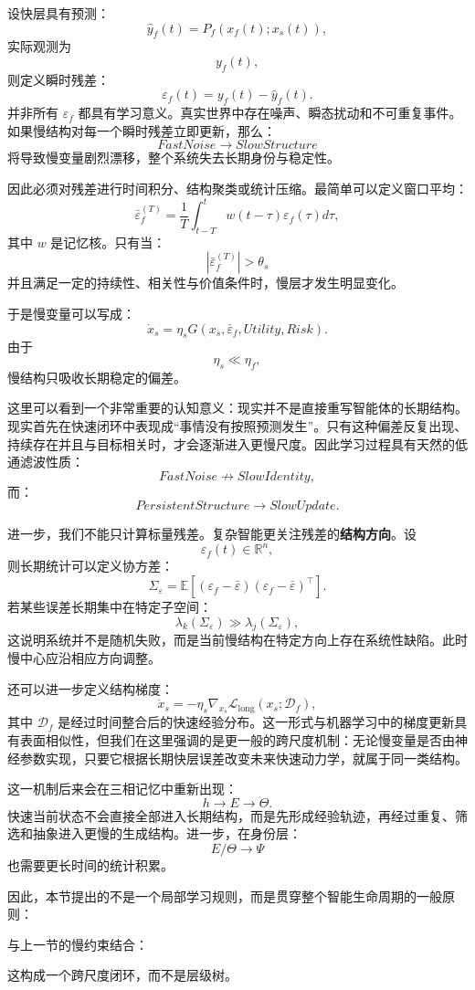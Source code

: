 设快层具有预测：
\[
\hat{y}_f(t)
=
P_f
\left(
x_f(t);x_s(t)
\right),
\]
实际观测为
\[
y_f(t),
\]
则定义瞬时残差：
\[
\varepsilon_f(t)
=
y_f(t)-\hat{y}_f(t).
\]
并非所有 $\varepsilon_f$ 都具有学习意义。真实世界中存在噪声、瞬态扰动和不可重复事件。如果慢结构对每一个瞬时残差立即更新，那么：
\[
FastNoise
\rightarrow
SlowStructure
\]
将导致慢变量剧烈漂移，整个系统失去长期身份与稳定性。

因此必须对残差进行时间积分、结构聚类或统计压缩。最简单可以定义窗口平均：
\[
\bar{\varepsilon}_f^{(T)}
=
\frac{1}{T}
\int_{t-T}^{t}
w(t-\tau)
\varepsilon_f(\tau)
d\tau,
\]
其中 $w$ 是记忆核。只有当：
\[
\left|
\bar{\varepsilon}_f^{(T)}
\right|
>
\theta_s
\]
并且满足一定的持续性、相关性与价值条件时，慢层才发生明显变化。

于是慢变量可以写成：
\[
\dot{x}_s
=
\eta_s
G
\left(
x_s,
\bar{\varepsilon}_f,
Utility,
Risk
\right).
\]
由于
\[
\eta_s\ll\eta_f,
\]
慢结构只吸收长期稳定的偏差。

这里可以看到一个非常重要的认知意义：现实并不是直接重写智能体的长期结构。现实首先在快速闭环中表现成“事情没有按照预测发生”。只有这种偏差反复出现、持续存在并且与目标相关时，才会逐渐进入更慢尺度。因此学习过程具有天然的低通滤波性质：
\[
FastNoise
\nrightarrow
SlowIdentity,
\]
而：
\[
PersistentStructure
\rightarrow
SlowUpdate.
\]

进一步，我们不能只计算标量残差。复杂智能更关注残差的\textbf{结构方向}。设
\[
\varepsilon_f(t)
\in
\mathbb{R}^n,
\]
则长期统计可以定义协方差：
\[
\Sigma_{\varepsilon}
=
\mathbb{E}
\left[
(\varepsilon_f-\bar{\varepsilon})
(\varepsilon_f-\bar{\varepsilon})^\top
\right].
\]
若某些误差长期集中在特定子空间：
\[
\lambda_k(\Sigma_\varepsilon)
\gg
\lambda_j(\Sigma_\varepsilon),
\]
这说明系统并不是随机失败，而是当前慢结构在特定方向上存在系统性缺陷。此时慢中心应沿相应方向调整。

还可以进一步定义结构梯度：
\[
\dot{x}_s
=
-\eta_s
\nabla_{x_s}
\mathcal{L}_{\mathrm{long}}
\left(
x_s;
\mathcal{D}_{f}
\right),
\]
其中 $\mathcal{D}_{f}$ 是经过时间整合后的快速经验分布。这一形式与机器学习中的梯度更新具有表面相似性，但我们在这里强调的是更一般的跨尺度机制：无论慢变量是否由神经参数实现，只要它根据长期快层误差改变未来快速动力学，就属于同一类结构。

这一机制后来会在三相记忆中重新出现：
\[
h
\rightarrow
E
\rightarrow
\Theta.
\]
快速当前状态不会直接全部进入长期结构，而是先形成经验轨迹，再经过重复、筛选和抽象进入更慢的生成结构。进一步，在身份层：
\[
E/\Theta
\rightarrow
\Psi
\]
也需要更长时间的统计积累。

因此，本节提出的不是一个局部学习规则，而是贯穿整个智能生命周期的一般原则：
\begin{statementbox}
\centering
{}
\end{statementbox}
与上一节的慢约束结合：
\begin{statementbox}
\centering
{}
\end{statementbox}
这构成一个跨尺度闭环，而不是层级树。

